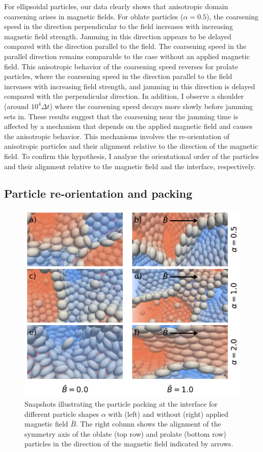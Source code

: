 For ellipsoidal particles, our data clearly shows that an\-isotropic
domain coarsening arises in magnetic fields.  For oblate particles
(\(\alpha=0.5\)), the coarsening speed in the direction perpendicular
to the field increases with increasing magnetic field strength.
Jamming in this direction appears to be delayed compared with the
direction parallel to the field. The coarsening speed in the parallel
direction remains comparable to the case without an applied magnetic
field. This anisotropic behavior of the coarsening speed reverses for
prolate particles, where the coarsening speed in the direction parallel to the field increases with increasing field strength, and jamming in this direction
is delayed compared with the perpendicular direction. In addition, I observe a shoulder (around \(10^4\Delta t\)) where the coarsening speed decays more slowly before jamming sets in. These results suggest that the coarsening near the jamming time is affected by a mechanism that depends on the applied magnetic field and causes the anisotropic
behavior. This mechanisms involves the re-orientation of anisotropic
particles and their alignment relative to the direction of the
magnetic field. To confirm this hypothesis, I analyze the
orientational order of the particles and their alignment relative to
the magnetic field and the interface, respectively.

\subsection{Particle re-orientation and packing}

\begin{figure}
\centering
\includegraphics[width=0.5\columnwidth]{figures/results/paper1/particle_packing_viz.png}
\caption{Snapshots illustrating the particle packing at the interface for different particle shapes $\alpha$ with (left) 
        and without (right) applied magnetic field $\bar{B}$. The right column shows the alignment of the symmetry axis of 
        the oblate (top row) and prolate (bottom row) particles in the direction of the magnetic field indicated by arrows.}
\label{fig:packing_viz}
\end{figure}

